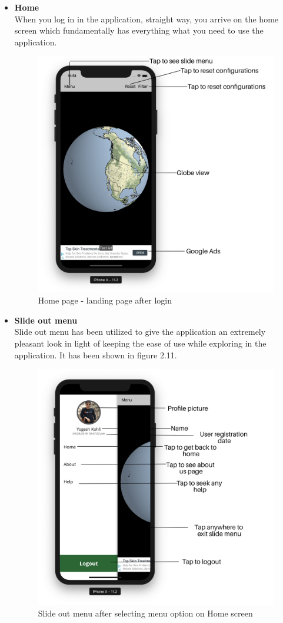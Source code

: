 \begin{itemize}
    
    \item \textbf{Home} \\
    When you log in in the application, straight way, you arrive on the home screen which fundamentally has everything what you need to use the application.
    
    \begin{figure}[H]
            \centering
            \includegraphics[width=0.5\linewidth]{figures/ch2/home.png}
            \caption{\label{fig:home_screen} Home page - landing page after login}
    \end{figure}
    

    \item \textbf{Slide out menu} \\
    Slide out menu has been utilized to give the application an extremely pleasant look in light of keeping the ease of use while exploring in the application. It has been shown in figure 2.11.
    
     \begin{figure}[H]
            \centering
            \includegraphics[width=0.50\linewidth]{figures/ch2/side_menu.png}
            \caption{\label{fig:side_menu} Slide out menu after selecting menu option on Home screen}
    \end{figure}
    

\end{itemize}
